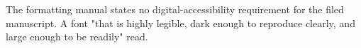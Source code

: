 %




	{The formatting manual states no digital-accessibility requirement for the
	 filed manuscript.}
	{A font "that is highly legible, dark enough to reproduce clearly, and large
	 enough to be readily" read.}

